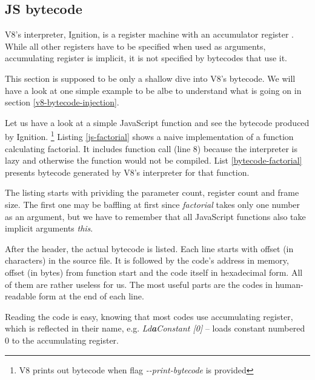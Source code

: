 \subsection{JS bytecode}
\label{v8-bytecode}
V8's interpreter, Ignition, is a register machine with an accumulator register \cite{medium:js-bytecode}.
While all other registers have to be specified when used as arguments, accumulating register
is implicit, it is not specified by bytecodes that use it.

This section is supposed to be only a shallow dive into V8's bytecode. We will have a look at one simple example
to be albe to understand what is going on in section \ref{v8-bytecode-injection}.

Let us have a look at a simple JavaScript function and see the bytecode produced by Ignition.
\footnote{V8 prints out bytecode when flag \emph{-{}-print-bytecode} is provided}
Listing \ref{js-factorial} shows a naive implementation of a function calculating factorial.
It includes function call (line 8) because the interpreter is lazy and otherwise the function would not be compiled.
List \ref{bytecode-factorial} presents bytecode generated by V8's interpreter for that function.




The listing starts with prividing the parameter count, register count and frame size. The first one may be baffling at first
since \emph{factorial} takes only one number as an argument, but we have to remember 
that all JavaScript functions also take implicit arguments \emph{this}.

After the header, the actual bytecode is listed. Each line starts with offset (in characters) in the source file.
It is followed by the code's address in memory, offset (in bytes) from function start and the code itself in hexadecimal form.
All of them are rather useless for us. The most useful parts are the codes in human-readable form at the end of each line.

Reading the code is easy, knowing that most codes use accumulating register, which is reflected in their name, e.g. 
\emph{Ld\textbf{a}Constant [0]} -- loads constant numbered 0 to the accumulating register.

